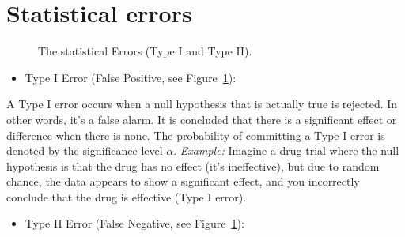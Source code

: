 \documentclass[
  a4paper,
]{scrbook}
\providecommand{\tightlist}{%
  \setlength{\itemsep}{0pt}\setlength{\parskip}{0pt}}\usepackage{longtable,booktabs,array}
\begin{document}
\section{Statistical errors}\label{statistical-errors}

\begin{figure}[ht]


\caption{\label{fig-stat-errors}The statistical Errors (Type I and Type
II).}

\end{figure}%

\begin{itemize}
\tightlist
\item
  Type I Error (False Positive, see Figure~\ref{fig-stat-errors}):
\end{itemize}

A Type I error occurs when a null hypothesis that is actually true is
rejected. In other words, it's a false alarm. It is concluded that there
is a significant effect or difference when there is none. The
probability of committing a Type I error is denoted by the
\hyperref[sign-level]{significance level \(\alpha\)}. \emph{Example:}
Imagine a drug trial where the null hypothesis is that the drug has no
effect (it's ineffective), but due to random chance, the data appears to
show a significant effect, and you incorrectly conclude that the drug is
effective (Type I error).

\begin{itemize}
\tightlist
\item
  Type II Error (False Negative, see Figure~\ref{fig-stat-errors}):
\end{itemize}
\end{document}
